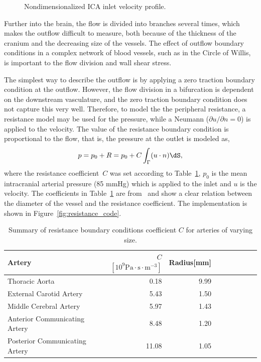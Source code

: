 \begin{figure}
  \begin{center}
  \end{center}
  \caption{Nondimensionalized ICA inlet velocity profile.}
  \label{fig:ford}
\end{figure}

Further into the brain, the flow is divided into branches several
times, which makes the outflow difficult to measure, both because of
the thickness of the cranium and the decreasing size of the vessels.
The effect of outflow boundary conditions in a complex network of
blood vessels, such as in the Circle of Willis, is important to the
flow division and wall shear stress.

The simplest way to describe the outflow is by applying a zero
traction boundary condition at the outflow. However, the flow division
in a bifurcation is dependent on the downstream vasculature, and the
zero traction boundary condition does not capture this very
well. Therefore, to model the the peripheral resistance, a resistance
model may be used for the pressure, while a Neumann (${\partial u /
  \partial n} = 0 $) is applied to the velocity. The value of the
resistance boundary condition is proportional to the flow, that is,
the pressure at the outlet is modeled as,
\begin{equation}
  p = p_0 + R = p_0 + C \int_\Gamma (u \cdot n) \dS,
\end{equation}
where the resistance coefficient~$C$ was set according to
Table~\ref{resistance_coeff}, $p_0$ is the mean intracranial arterial
pressure (85 mmHg) which is applied to the inlet and $u$ is the
velocity. The coefficients in Table~\ref{resistance_coeff} are
from~\cite{peiro} and show a clear relation between the diameter of
the vessel and the resistance coefficient. The implementation is shown
in Figure~\ref{fig:resistance_code}.

\begin{table}
  \begin{center}
    \begin{tabular}{l*{7}{r}r}
      Artery & $C$ $ [10^9 \mathrm{Pa} \cdot \mathrm{s}  \cdot \mathrm{m}^{-3}]$ & Radius[mm]\\
      \hline
      Thoracic Aorta			&  0.18 &  	9.99\\
      External Carotid Artery  	& 5.43   &	1.50\\
      Middle Cerebral Artery  	& 5.97   &	1.43\\
      Anterior Communicating Artery  	& 8.48   &	1.20\\
      Posterior Communicating Artery  & 11.08   &	1.05\\
    \end{tabular}
  \end{center}
  \caption{Summary of resistance boundary conditions coefficient $C$
    for arteries of varying size.}
  \label{resistance_coeff}
\end{table}

